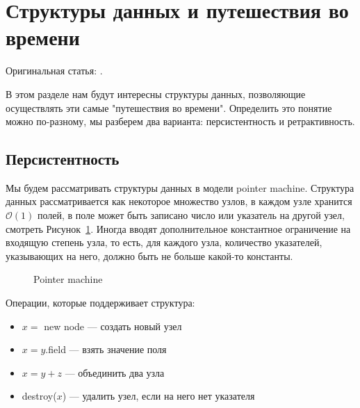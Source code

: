 \section{Структуры данных и путешествия во времени} 

Оригинальная статья: \cite{demaine2007retroactive}.

В этом разделе нам будут интересны структуры данных, позволяющие осуществлять эти самые "путешествия во времени".
Определить это понятие можно по-разному, мы разберем два варианта: персистентность и ретрактивность.

\subsection{Персистентность}

Мы будем рассматривать структуры данных в модели pointer machine.
Структура данных рассматривается как некоторое множество узлов, в каждом узле хранится $\mathcal{O}(1)$ полей, в поле может быть записано число или указатель на другой узел, смотреть Рисунок~\ref{fig:TanyaPM}.
Иногда вводят дополнительное константное ограничение на входящую степень узла, то есть, для каждого узла, количество указателей, указывающих на него, должно быть не больше какой-то константы.

\begin{figure}[h] \centering
{}
	\caption{Pointer machine}
	\label{fig:TanyaPM}
\end{figure}

\vspace{10pt}
Операции, которые поддерживает структура: 

\begin{itemize}

\item $x = $ new node --- создать новый узел
\item $x = y.$field --- взять значение поля
\item $x = y + z$ --- объединить два узла
\item destroy($x$) --- удалить узел, если на него нет указателя

\end{itemize}

